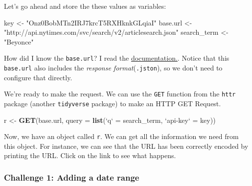 \documentclass[]{book}
\newenvironment{Shaded}{\begin{snugshade}}{\end{snugshade}}
\newcommand{\KeywordTok}[1]{\textcolor[rgb]{0.13,0.29,0.53}{\textbf{#1}}}
\newcommand{\DataTypeTok}[1]{\textcolor[rgb]{0.13,0.29,0.53}{#1}}
\newcommand{\StringTok}[1]{\textcolor[rgb]{0.31,0.60,0.02}{#1}}
\newcommand{\CommentTok}[1]{\textcolor[rgb]{0.56,0.35,0.01}{\textit{#1}}}
\newcommand{\OperatorTok}[1]{\textcolor[rgb]{0.81,0.36,0.00}{\textbf{#1}}}
\newcommand{\NormalTok}[1]{#1}
\begin{document}
Let's go ahead and store the these values as variables:

\begin{Shaded}
\begin{Highlighting}[]
\NormalTok{key <-}\StringTok{ "Onz0BobMTn2IRJ7krcT5RXHknkGLqiaI"}
\NormalTok{base.url <-}\StringTok{ "http://api.nytimes.com/svc/search/v2/articlesearch.json"}
\NormalTok{search_term <-}\StringTok{ "Beyonce"}
\end{Highlighting}
\end{Shaded}

How did I know the \texttt{base.url}? I read the
\href{https://developer.nytimes.com/docs/articlesearch-product/1/routes/articlesearch.json/get}{documentation.}.
Notice that this \texttt{base.url} also includes the \emph{response
format}(\texttt{.jston}), so we don't need to configure that directly.

We're ready to make the request. We can use the \texttt{GET} function
from the \texttt{httr} package (another \texttt{tidyverse} package) to
make an HTTP GET Request.

\begin{Shaded}
\begin{Highlighting}[]
\NormalTok{r <-}\StringTok{ }\KeywordTok{GET}\NormalTok{(base.url, }\DataTypeTok{query =} \KeywordTok{list}\NormalTok{(}\StringTok{`}\DataTypeTok{q}\StringTok{`}\NormalTok{ =}\StringTok{ }\NormalTok{search_term,}
                                \StringTok{`}\DataTypeTok{api-key}\StringTok{`}\NormalTok{ =}\StringTok{ }\NormalTok{key))}
\end{Highlighting}
\end{Shaded}

Now, we have an object called \texttt{r}. We can get all the information
we need from this object. For instance, we can see that the URL has been
correctly encoded by printing the URL. Click on the link to see what
happens.

\begin{Shaded}
\end{Shaded}

\subsubsection*{Challenge 1: Adding a date
range}\label{challenge-1-adding-a-date-range}
\end{document}
